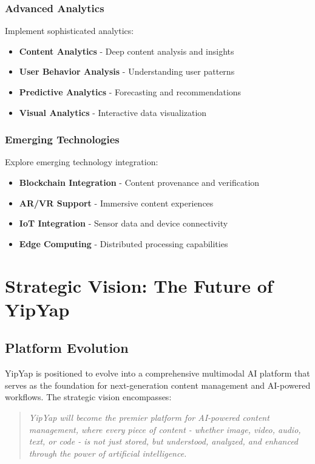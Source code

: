 \documentclass[11pt]{article}
\begin{document}
\subsubsection{Advanced Analytics}

Implement sophisticated analytics:

\begin{itemize}
\item \textbf{Content Analytics} - Deep content analysis and insights
\item \textbf{User Behavior Analysis} - Understanding user patterns
\item \textbf{Predictive Analytics} - Forecasting and recommendations
\item \textbf{Visual Analytics} - Interactive data visualization
\end{itemize}

\subsubsection{Emerging Technologies}

Explore emerging technology integration:

\begin{itemize}
\item \textbf{Blockchain Integration} - Content provenance and verification
\item \textbf{AR/VR Support} - Immersive content experiences
\item \textbf{IoT Integration} - Sensor data and device connectivity
\item \textbf{Edge Computing} - Distributed processing capabilities
\end{itemize}

\section{Strategic Vision: The Future of YipYap}

\subsection{Platform Evolution}

YipYap is positioned to evolve into a comprehensive multimodal AI platform that serves as the foundation for next-generation content management and AI-powered workflows. The strategic vision encompasses:

\begin{quote}
\emph{YipYap will become the premier platform for AI-powered content management, where every piece of content - whether image, video, audio, text, or code - is not just stored, but understood, analyzed, and enhanced through the power of artificial intelligence.}
\end{quote}
\end{document}
